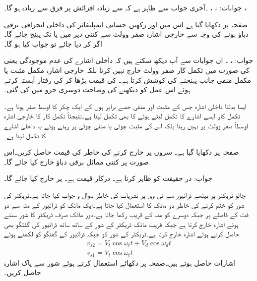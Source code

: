 جوابات: ،  ، ۔آخری جواب سے ظاہر ہے کہ  سے زیادہ افزائش پر فرق  سے زیادہ ہو گا۔ ، 

صفحہ  پر  دکھایا گیا ہے۔اس میں  اور  رکھیں۔حسابی ایمپلیفائر کی داخلی انحرافی برقی دباؤ  ہونے کی وجہ سے خارجی اشارہ صفر وولٹ سے کتنی دیر میں  یا  تک پہنچ جائے گا۔اگر   کر دیا جائے تو جواب کیا ہو گا۔

جواب: ،  ۔ ان جوابات سے آپ دیکھ سکتے ہیں کہ داخلی اشارے کی عدم موجودگی یعنی   کی صورت میں تکمل کار صفر وولٹ خارج نہیں کرتا بلکہ خارجی اشارہ مکمل مثبت یا مکمل منفی جانب پہنچنے کی کوشش کرتا ہے۔ کی قیمت بڑھا کر   کی رفتار آہستہ کرتے ہوئے اس عمل کو دیکھنے کی وضاحت دوسری جزو میں کی گئی۔

ایسا بدلتا داخلی اشارہ جس کے مثبت اور منفی حصے  برابر ہوں کے ایک چکر کا اوسط صفر ہوتا ہے۔تکمل کار ایسے اشارے کا تکمل لیتے ہوئے  کا بھی تکمل لیتا ہے۔نتیجتاً تکمل کار کا خارجی اشارہ اوسطاً صفر وولٹ پر نہیں رہتا بلکہ اس کی مثبت چوٹی  یا منفی چوٹی  پر رہتے ہوئے یہ داخلی اشارے کا تکمل لیتا ہے۔

صفحہ  پر  دکھایا گیا ہے۔ سروں  پر  خارج کرنے کی خاطر  کی قیمت حاصل کریں۔اس صورت   پر کتنی مماثل برقی دباؤ خارج کیا جائے گا۔

جواب: در حقیقت  کو ظاہر کرتا ہے۔  درکار قیمت ہے۔ پر  خارج کیا جائے گا۔

 
چالو ٹریکٹر پر بیٹھے ڈرائیور سے  ٹی وی پر نشریات کی خاطر سوال و جواب کیا جاتا ہے۔ٹریکٹر کی شور کو ختم کرنے کی خاطر دو مائک کا استعمال کیا جاتا ہے۔ایک مائک کو ڈرائیور کے منہ سے دو فٹ کے فاصلے پر جبکہ دوسرے کو منہ کے قریب رکھا جاتا ہے۔دور مائک صرف ٹریکٹر کا شور سنتے ہوئے  اشارہ خارج کرتا ہے جبکہ قریب مائک ٹریکٹر کے شور کے ساتھ ساتھ ڈرائیور کی گفتگو بھی حاصل کرتے ہوئے اشارہ  خارج کرتا ہے۔ٹریکٹر کے شور کو  جبکہ ڈرائیور کے گفتگو کو  لکھتے ہوئے
\begin{align*}
v_{s2}=V_t \cos \omega_t t +V_d \cos \omega_d t\\
v_{s1}=V_t \cos \omega_t t
\end{align*} 
اشارات حاصل ہوتے ہیں۔صفحہ  پر دکھائے  استعمال کرتے ہوئے شور سے پاک اشارہ حاصل کریں۔

